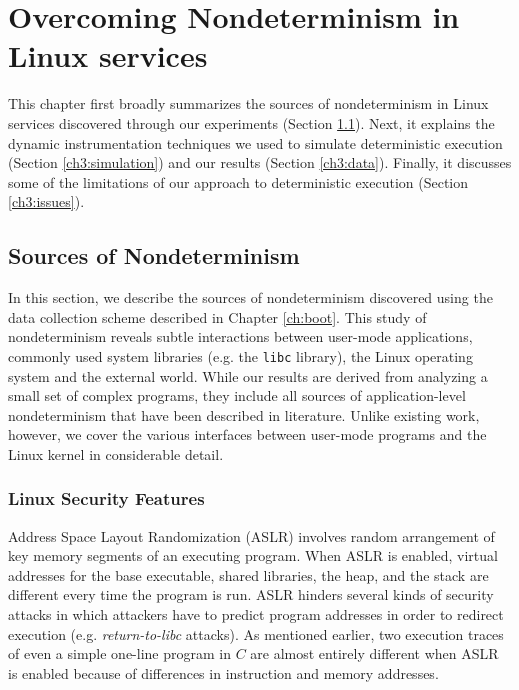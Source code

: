 \newenvironment{mylisting}
{\begin{list}{}{\setlength{\leftmargin}{1em}}\item\scriptsize\bfseries}
{\end{list}}

\chapter{Overcoming Nondeterminism in Linux services}
This chapter first broadly summarizes the sources of nondeterminism
in Linux services discovered through our experiments (Section \ref{ch3:sources}).
Next, it explains the dynamic instrumentation techniques
we used to simulate deterministic execution (Section \ref{ch3:simulation})
and our results (Section \ref{ch3:data}).
Finally, it discusses some of the limitations 
of our approach to deterministic execution (Section \ref{ch3:issues}).

\section{Sources of Nondeterminism} \label{ch3:sources}
In this section, we describe the sources of nondeterminism
discovered using the data collection scheme
described in Chapter \ref{ch:boot}.
This study of nondeterminism reveals
subtle interactions between user-mode
applications, commonly used system libraries (e.g. the \texttt{libc} library),
the Linux operating system and the external world.
While our results are derived from analyzing a small
set of complex programs, they include
all sources of application-level nondeterminism that 
have been described in literature. Unlike existing work,
however, we cover the various interfaces between user-mode programs
and the Linux kernel in considerable detail.

\subsection{Linux Security Features} \label{ch3:security}
 \newline
Address Space Layout Randomization (ASLR) involves random arrangement of
key memory segments of an executing program. When ASLR is enabled,
virtual addresses for the base executable, shared libraries, 
the heap, and the stack are different every time the program is run.
ASLR hinders several kinds of security attacks in which attackers have to predict
program addresses in order to redirect execution (e.g. \emph{return-to-libc} attacks). 
As mentioned earlier, two execution traces of even a
simple one-line program in $C$ are almost entirely different
when ASLR is enabled because of differences in
instruction and memory addresses. \newline


